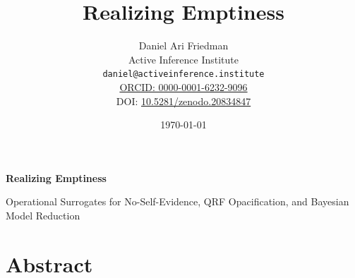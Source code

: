 \documentclass[
]{article}
\author{}
\date{}
\title{Realizing Emptiness}
\author{Daniel Ari Friedman\\\footnotesize{Active Inference Institute}\\\footnotesize{\texttt{daniel@activeinference.institute}}\\\footnotesize{\href{https://orcid.org/0000-0001-6232-9096}{ORCID: 0000-0001-6232-9096}} \\ \footnotesize{DOI: \href{https://doi.org/10.5281/zenodo.20834847}{10.5281/zenodo.20834847}}}
\date{\today}
\begin{document}
\begin{titlepage}
\centering
\vspace*{2cm}
{\LARGE\bfseries Realizing Emptiness\par}
\vspace{0.75em}
{\large Operational Surrogates for No-Self-Evidence, QRF Opacification, and Bayesian Model Reduction\par}
\vfill
\makeatletter
{\@author\par}
\vspace{1em}
{\@date\par}
\makeatother
\vfill
\end{titlepage}
\thispagestyle{empty}
\tableofcontents
\newpage


\section{Abstract}\label{sec:abstract}
\end{document}
